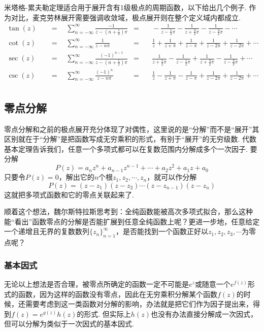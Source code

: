 \documentclass[UTF8]{ctexart}
\begin{document}
米塔格-累夫勒定理适合用于展开含有1级极点的周期函数，以下给出几个例子. 作为对比，麦克劳林展开需要强调收敛域，极点展开则在整个定义域内都成立.
\begin{align*}
    \tan(z) \quad&=\quad \sum_{n=-\infty}^{\infty}\frac{-1}{z-\left(n+\frac{1}{2}\right)\pi} &=&\quad -\frac{1}{z-\frac{1}{2}\pi}-\frac{1}{z+\frac{3}{2}\pi}-\frac{1}{z-\frac{3}{2}\pi}-\cdots & \\
    \cot(z) \quad&=\quad \sum_{n=-\infty}^{\infty}\frac{1}{z-n\pi} &=&\quad \frac{1}{z}+\frac{1}{z+\pi}+\frac{1}{z-\pi}+\frac{1}{z-2\pi}+\frac{1}{z-2\pi}+\cdots & \\
    \sec(z) \quad&=\quad \sum_{n=-\infty}^{\infty}\frac{(-1)^{n-1}}{z-\left(n+\frac{1}{2}\right)\pi} &=&\quad \frac{1}{z+\frac{1}{2}\pi}-\frac{1}{z-\frac{1}{2}\pi}+\frac{1}{z+\frac{3}{2}\pi}-\frac{1}{z-\frac{3}{2}\pi}+\cdots & \\
    \csc(z) \quad&=\quad \sum_{n=-\infty}^{\infty}\frac{(-1)^{n}}{z-n\pi} &=&\quad \frac{1}{z}-\frac{1}{z+\pi}-\frac{1}{z-\pi}+\frac{1}{z-2\pi}+\frac{1}{z-2\pi}+\cdots & \\
\end{align*}

\subsection{零点分解}

零点分解和之前的极点展开充分体现了对偶性，这里说的是“分解”而不是“展开”其区别就在于“分解”是把函数写成无穷乘积的形式，有别于“展开”的无穷级数. 代数基本定理告诉我们，任意一个多项式都可以在复数范围内分解成多个一次因子. 要分解
\[P(z)=a_nz^n+a_{n-1}z^{n-1}+\cdots+a_2z^2+a_1z+a_0\]
只要令\(P(z)=0\)，解出它的\(n\)个根\(z_1,z_2,\cdots,z_n\)，就可以作分解
\[P(z) = (z-z_1)(z-z_2)\cdots(z-z_{n-1})(z-z_n)\]
这就把多项式函数和它的零点关联起来了.

顺着这个想法，魏尔斯特拉斯思考到：全纯函数能被高次多项式拟合，那么这种能“看出”函数零点的分解是否能扩展到任意全纯函数上呢？更进一步地，任意给定一个递增且无界的复数数列\(\{z_n\}_{n=1}^{\infty}\)，是否能找到一个函数正好以\(z_1,z_2,z_3,\cdots\)为零点呢？

\subsubsection{基本因式}

无论以上想法是否合理，被零点所确定的函数一定不可能是\(e^{z}\)或随意一个\(e^{f(z)}\)形式的函数，因为这样的函数没有零点，因此在无穷乘积分解某个函数\(f(z)\)的时候，还需要考虑到这一类函数对分解的影响，办法就是把它们作为因子提出来，得到\(f(z)=e^{g(z)}h(z)\)的形式. 但实际上\(h(z)\)也没有办法直接分解成一次因式，但可以分解为类似于一次因式的基本因式.
\end{document}
